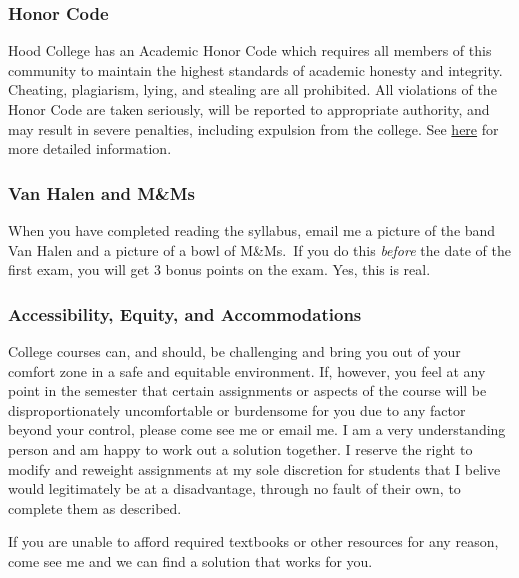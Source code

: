\documentclass{article}
\begin{document}
\hypertarget{honor-code}{%
\subsubsection{Honor Code}\label{honor-code}}

Hood College has an Academic Honor Code which requires all members of
this community to maintain the highest standards of academic honesty and
integrity. Cheating, plagiarism, lying, and stealing are all prohibited.
All violations of the Honor Code are taken seriously, will be reported
to appropriate authority, and may result in severe penalties, including
expulsion from the college. See
\href{http://hood.smartcatalogiq.com/en/2016-2017/Catalog/The-Spirit-of-Hood/The-Academic-Honor-Code-and-Code-of-Conduct}{here}
for more detailed information.

\hypertarget{van-halen-and-mms}{%
\subsubsection{Van Halen and M\&Ms}\label{van-halen-and-mms}}

When you have completed reading the syllabus, email me a picture of the
band Van Halen and a picture of a bowl of M\&Ms.~If you do this
\emph{before} the date of the first exam, you will get 3 bonus points on
the exam. Yes, this is real.

\hypertarget{accessibility-equity-and-accommodations}{%
\subsubsection{Accessibility, Equity, and
Accommodations}\label{accessibility-equity-and-accommodations}}

College courses can, and should, be challenging and bring you out of
your comfort zone in a safe and equitable environment. If, however, you
feel at any point in the semester that certain assignments or aspects of
the course will be disproportionately uncomfortable or burdensome for
you due to any factor beyond your control, please come see me or email
me. I am a very understanding person and am happy to work out a solution
together. I reserve the right to modify and reweight assignments at my
sole discretion for students that I belive would legitimately be at a
disadvantage, through no fault of their own, to complete them as
described.

If you are unable to afford required textbooks or other resources for
any reason, come see me and we can find a solution that works for you.
\end{document}
